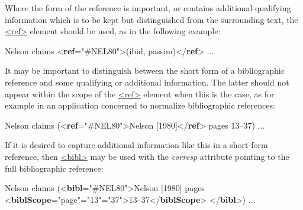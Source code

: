 Where the form of the reference is important, or contains additional qualifying information which is to be kept but distinguished from the surrounding text, the \hyperref[TEI.ref]{<ref>} element should be used, as in the following example: \par\bgroup{}\exampleFont \begin{shaded}\noindent\mbox{}Nelson claims {<\textbf{ref}\hspace*{1em}{target}="{\#NEL80}">}(ibid, passim){</\textbf{ref}>} ...\end{shaded}\egroup\par \noindent  It may be important to distinguish between the short form of a bibliographic reference and some qualifying or additional information. The latter should not appear within the scope of the \hyperref[TEI.ref]{<ref>} element when this is the case, as for example in an application concerned to normalize bibliographic references: \par\bgroup{}\exampleFont \begin{shaded}\noindent\mbox{}Nelson claims ({<\textbf{ref}\hspace*{1em}{target}="{\#NEL80}">}Nelson [1980]{</\textbf{ref}>} pages 13–37)\mbox{}\newline 
 ...\end{shaded}\egroup\par \noindent  If it is desired to capture additional information like this in a short-form reference, then \hyperref[TEI.bibl]{<bibl>} may be used with the {\itshape corresp} attribute pointing to the full bibliographic reference: \par\bgroup{}\exampleFont \begin{shaded}\noindent\mbox{}Nelson claims ({<\textbf{bibl}\hspace*{1em}{corresp}="{\#NEL80}">}Nelson [1980] pages {<\textbf{biblScope}\hspace*{1em}{unit}="{page}"\hspace*{1em}{from}="{13}"\hspace*{1em}{to}="{37}">}13–37{</\textbf{biblScope}>}\mbox{}\newline 
{</\textbf{bibl}>}) ...\end{shaded}\egroup\par \par
